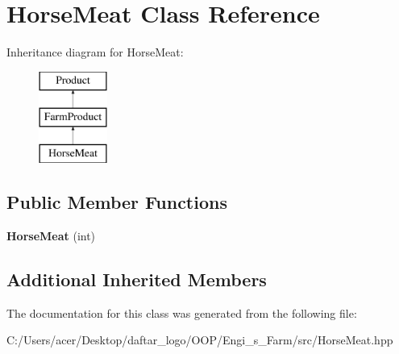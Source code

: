 \hypertarget{class_horse_meat}{}\section{Horse\+Meat Class Reference}
\label{class_horse_meat}
Inheritance diagram for Horse\+Meat\+:\begin{figure}[H]
\begin{center}
\leavevmode
\includegraphics[height=3.000000cm]{class_horse_meat}
\end{center}
\end{figure}
\subsection*{Public Member Functions}
\begin{DoxyCompactItemize}
\item 
\mbox{\label{class_horse_meat_a58b9dd2ba0277062e3f5873767ff6a89}} 
{\bfseries Horse\+Meat} (int)
\end{DoxyCompactItemize}
\subsection*{Additional Inherited Members}


The documentation for this class was generated from the following file\+:\begin{DoxyCompactItemize}
\item 
C\+:/\+Users/acer/\+Desktop/daftar\+\_\+logo/\+O\+O\+P/\+Engi\+\_\+s\+\_\+\+Farm/src/Horse\+Meat.\+hpp\end{DoxyCompactItemize}
